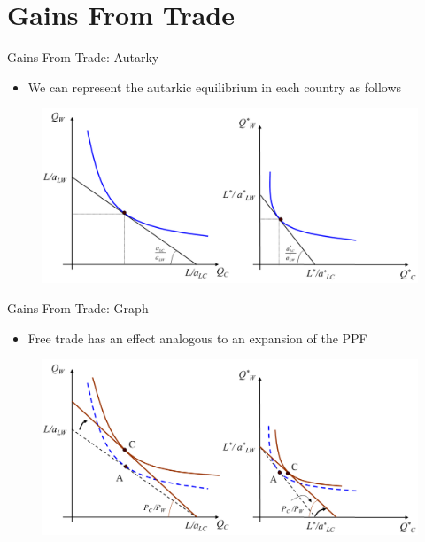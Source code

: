 \documentclass[10pt,hyperref={CJKbookmarks=true},xcolor=dvipsnames,aspectratio=169]{beamer}
\begin{document}
\section{Gains From Trade}
\begin{frame}{Gains From Trade: Autarky}

\begin{itemize}
\item We can represent the autarkic equilibrium in each country as follows 
\end{itemize}

\begin{figure}
\begin{centering}
\includegraphics[width=12cm]{fig/ricardo/lec3-11}
\par\end{centering}

\end{figure}


\end{frame}

\begin{frame}{Gains From Trade: Graph }

\begin{itemize}
\item Free trade has an effect analogous to an expansion of the PPF 
\end{itemize}

\begin{figure}
\begin{centering}
\includegraphics[width=12cm]{fig/ricardo/lec3-12}
\par\end{centering}

\end{figure}



\end{frame}
\end{document}
